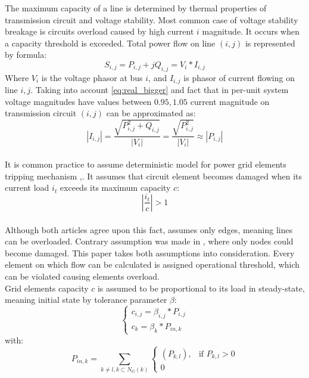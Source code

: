 \documentclass[twoside]{iisthesis}
\begin{document}
The maximum capacity of a line is  determined by thermal properties of transmission circuit and voltage stability. Most common case of voltage stability breakage  is circuits overload caused by high current \(i\) magnitude. It occurs when a capacity threshold is exceeded. Total power flow on line \((i,j)\) is represented by formula:
\begin{equation}\label{eq:total_power}
	S_{i,j} = P_{i,j} + jQ_{i,j} = V_i*I_{i,j}
\end{equation}
Where \(V_{i}\) is the voltage phasor at bus \(i\), and \(I_{i,j}\) is phasor of current flowing on line \(i,j\). Taking into account \eqref{eq:real_bigger} and fact that in per-unit system voltage magnitudes have values between \(0.95,1.05\) current magnitude on transmission circuit \((i,j)\) can be approximated as:
\begin{equation}\label{eq:current_magnitude}
|I_{i,j}| = \dfrac{\sqrt{P_{i,j}^2 + Q_{i,j}}}{|V_{i}|} = \dfrac{\sqrt{P_{i,j}^2}}{|V_{i}|} \approx |P_{i,j}|
\end{equation}
\\
It is common practice to assume deterministic model for power grid elements tripping mechanism \cite{Koc2014},\cite{Asztalos2014}. It assumes that circuit element becomes damaged when its current load \(i_t\)  exceeds its maximum capacity \(c\):
\begin{equation}\label{eq:overload}
	|\dfrac{i_t}{c}| > 1
\end{equation} 
\\
Although both articles agree upon this fact, \cite{Koc2014} assumes only edges, meaning lines can be overloaded. Contrary assumption was made in \cite{Asztalos2014}, where only nodes could become damaged.
This paper takes both assumptions into consideration. Every element on which flow can be calculated is assigned operational threshold, which can be violated causing elements overload. 
\\
Grid elements capacity  \(c\) is assumed to be proportional to its load in steady-state, meaning initial state by tolerance parameter \(\beta\):
\begin{equation}\label{eq:el_capacity}
	\begin{cases}
	c_{i,j}=\beta_{i,j} * P_{i,j} \\
	c_{k} = \beta_k * P_{in,k} 
	\end{cases}
\end{equation}  
with:
\[
	P_{in,k}=\sum_{k \neq l , k \subset N_G(k)} \begin{cases}
	(P_{k,l}), & \mbox{if } P_{k,l} >0 \\ 0
	\end{cases}
\]
\end{document}
